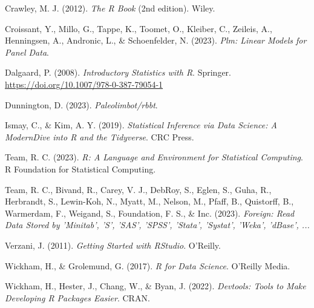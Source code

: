 \documentclass[a4paper, nobind]{templates/ociamthesis}
\newlength{\cslhangindent}
\newenvironment{CSLReferences}[2] %
 {%
  \setlength{\parindent}{0pt}
  \ifodd #1
  \let\oldpar\par
  \def\par{\hangindent=\cslhangindent\oldpar}
  \fi
  \setlength{\parskip}{1mm}
  \setlength{\baselineskip}{6mm}
 }%
 {}
\begin{document}
\hypertarget{refs}{}
\begin{CSLReferences}{1}{0}
\leavevmode{}%
Crawley, M. J. (2012). \emph{The {R Book}} (2nd edition). {Wiley}.

\leavevmode{}%
Croissant, Y., Millo, G., Tappe, K., Toomet, O., Kleiber, C., Zeileis, A., Henningsen, A., Andronic, L., \& Schoenfelder, N. (2023). \emph{Plm: {Linear Models} for {Panel Data}}.

\leavevmode{}%
Dalgaard, P. (2008). \emph{Introductory {Statistics} with {R}}. {Springer}. \url{https://doi.org/10.1007/978-0-387-79054-1}

\leavevmode{}%
Dunnington, D. (2023). \emph{Paleolimbot/rbbt}.

\leavevmode{}%
Ismay, C., \& Kim, A. Y. (2019). \emph{Statistical {Inference} via {Data Science}: {A ModernDive} into {R} and the {Tidyverse}}. {CRC Press}.

\leavevmode{}%
Team, R. C. (2023). \emph{R: {A Language} and {Environment} for {Statistical Computing}}. R Foundation for Statistical Computing.

\leavevmode{}%
Team, R. C., Bivand, R., Carey, V. J., DebRoy, S., Eglen, S., Guha, R., Herbrandt, S., Lewin-Koh, N., Myatt, M., Nelson, M., Pfaff, B., Quistorff, B., Warmerdam, F., Weigand, S., Foundation, F. S., \& Inc. (2023). \emph{Foreign: {Read Data Stored} by '{Minitab}', '{S}', '{SAS}', '{SPSS}', '{Stata}', '{Systat}', '{Weka}', '{dBase}', ...}

\leavevmode{}%
Verzani, J. (2011). \emph{Getting {Started} with {RStudio}}. {O'Reilly}.

\leavevmode{}%
Wickham, H., \& Grolemund, G. (2017). \emph{R for {Data Science}}. {O'Reilly Media}.

\leavevmode{}%
Wickham, H., Hester, J., Chang, W., \& Byan, J. (2022). \emph{Devtools: {Tools} to {Make Developing R Packages Easier}}. CRAN.

\end{CSLReferences}

\end{document}

